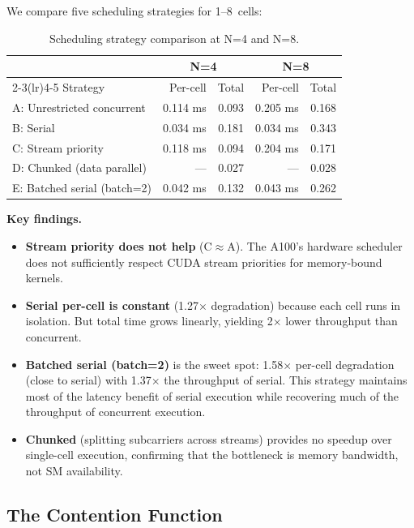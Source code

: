 We compare five scheduling strategies for 1--8~cells:

\begin{table}[h]
\centering
\small
\caption{Scheduling strategy comparison at N=4 and N=8.}
\label{tab:strategies}
\begin{tabular}{@{}lrrrr@{}}
\toprule
 & \multicolumn{2}{c}{N=4} & \multicolumn{2}{c}{N=8} \\
\cmidrule(lr){2-3}\cmidrule(lr){4-5}
Strategy & Per-cell & Total & Per-cell & Total \\
\midrule
A: Unrestricted concurrent & 0.114 ms & 0.093 & 0.205 ms & 0.168 \\
B: Serial & 0.034 ms & 0.181 & 0.034 ms & 0.343 \\
C: Stream priority & 0.118 ms & 0.094 & 0.204 ms & 0.171 \\
D: Chunked (data parallel) & --- & 0.027 & --- & 0.028 \\
E: Batched serial (batch=2) & 0.042 ms & 0.132 & 0.043 ms & 0.262 \\
\bottomrule
\end{tabular}
\end{table}

\textbf{Key findings.}
\begin{itemize}[leftmargin=*,nosep]
\item \textbf{Stream priority does not help} (C$\approx$A). The A100's hardware scheduler does not sufficiently respect CUDA stream priorities for memory-bound kernels.
\item \textbf{Serial per-cell is constant} (1.27$\times$ degradation) because each cell runs in isolation. But total time grows linearly, yielding 2$\times$ lower throughput than concurrent.
\item \textbf{Batched serial (batch=2)} is the sweet spot: 1.58$\times$ per-cell degradation (close to serial) with 1.37$\times$ the throughput of serial. This strategy maintains most of the latency benefit of serial execution while recovering much of the throughput of concurrent execution.
\item \textbf{Chunked} (splitting subcarriers across streams) provides no speedup over single-cell execution, confirming that the bottleneck is memory bandwidth, not SM availability.
\end{itemize}

\subsection{The Contention Function}
\label{sec:contention_fn}

